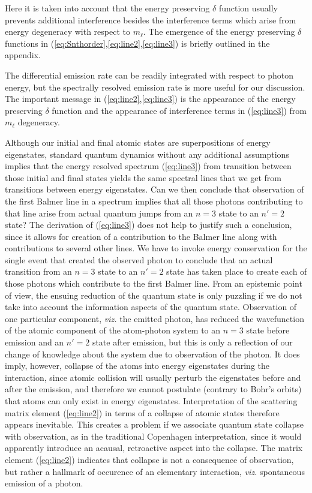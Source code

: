 \documentclass[final,3p,12pt]{elsarticle3}
\begin{document}
Here it is taken into account that the energy preserving $\delta$ function 
usually prevents additional interference besides the interference terms
which arise from energy degeneracy with respect to $m_\ell$. The emergence
of the energy preserving $\delta$ functions 
in (\ref{eq:Snthorder},\ref{eq:line2},\ref{eq:line3}) 
is briefly outlined in the appendix.

The differential emission rate can be readily integrated with respect to 
photon energy, but the spectrally resolved emission rate is more useful for 
our discussion. The important message in (\ref{eq:line2},\ref{eq:line3}) is 
the appearance of the energy preserving $\delta$ function and the appearance 
of interference terms in (\ref{eq:line3}) from $m_\ell$ degeneracy.

Although our initial and final atomic states are superpositions of
energy eigenstates, standard quantum dynamics without any additional
assumptions implies that the energy resolved spectrum (\ref{eq:line3}) from 
transition between those initial and final states yields the same  
spectral lines that we get from transitions between energy eigenstates.
Can we then conclude that observation of the first Balmer line in a spectrum 
implies that all those photons contributing to that line arise from
actual quantum jumps from an $n=3$ state to an $n'=2$ state?
The derivation of (\ref{eq:line3}) does not help to justify such a
conclusion, since it allows for creation of a contribution to the
Balmer line along with contributions to several other lines. 
We have to invoke energy conservation for the single event that
created the observed photon to conclude that an actual
transition from an $n=3$ state to an $n'=2$ state has taken place to create
each of those photons which contribute to the first Balmer line. From an
epistemic point of view, the ensuing reduction of the quantum state 
is only puzzling if we do not take into account the information aspects of the 
quantum state. Observation of one particular component, {\it viz.} the emitted 
photon, has reduced the wavefunction of the atomic component of the atom-photon 
system to an $n=3$ state before emission and an $n'=2$ state after emission, but 
this is only a reflection of our change of knowledge about the system due to
observation of the photon. It does imply, however, collapse of the atoms into 
energy eigenstates during the interaction, since atomic collision will usually 
perturb the eigenstates before and after the emission, and therefore we cannot 
postulate (contrary to Bohr's orbits) that atoms can only exist in energy eigenstates.
Interpretation of the scattering matrix element (\ref{eq:line2}) in terms
of a collapse of atomic states therefore appears inevitable.
This creates a problem if we associate quantum state collapse with observation, 
as in the traditional Copenhagen interpretation, since it would apparently 
introduce an acausal, retroactive aspect into the collapse. The 
matrix element (\ref{eq:line2}) indicates that collapse is not
a consequence of observation, but rather a hallmark of occurence of
an elementary interaction, {\it viz.} spontaneous emission of a photon.
\end{document}
